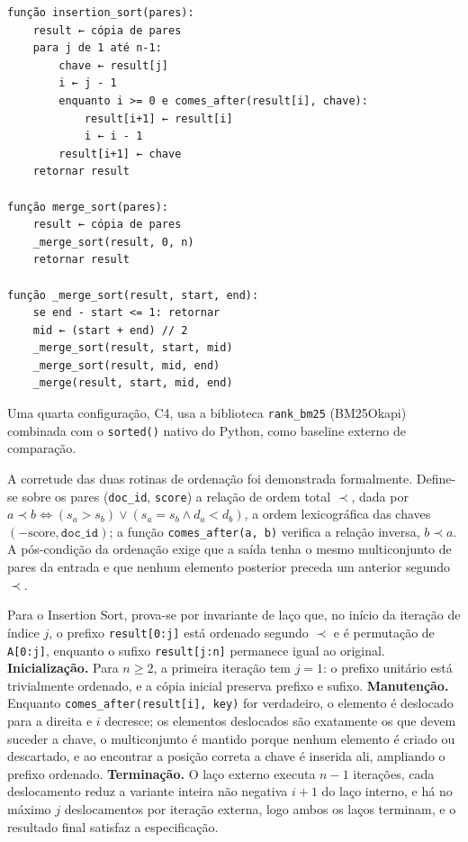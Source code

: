 \documentclass[12pt, a4paper]{article}
\begin{document}
\begin{verbatim}
função insertion_sort(pares):
    result ← cópia de pares
    para j de 1 até n-1:
        chave ← result[j]
        i ← j - 1
        enquanto i >= 0 e comes_after(result[i], chave):
            result[i+1] ← result[i]
            i ← i - 1
        result[i+1] ← chave
    retornar result

função merge_sort(pares):
    result ← cópia de pares
    _merge_sort(result, 0, n)
    retornar result

função _merge_sort(result, start, end):
    se end - start <= 1: retornar
    mid ← (start + end) // 2
    _merge_sort(result, start, mid)
    _merge_sort(result, mid, end)
    _merge(result, start, mid, end)
\end{verbatim}

Uma quarta configuração, C4, usa a biblioteca \texttt{rank\_bm25} (BM25Okapi) combinada com o \texttt{sorted()} nativo do Python, como baseline externo de comparação.

A corretude das duas rotinas de ordenação foi demonstrada formalmente. Define-se sobre os pares (\texttt{doc\_id}, \texttt{score}) a relação de ordem total $\prec$, dada por $a \prec b \iff (s_a > s_b) \lor (s_a = s_b \land d_a < d_b)$, a ordem lexicográfica das chaves $(-\text{score}, \texttt{doc\_id})$; a função \texttt{comes\_after(a, b)} verifica a relação inversa, $b \prec a$. A pós-condição da ordenação exige que a saída tenha o mesmo multiconjunto de pares da entrada e que nenhum elemento posterior preceda um anterior segundo $\prec$.

Para o Insertion Sort, prova-se por invariante de laço que, no início da iteração de índice $j$, o prefixo \texttt{result[0:j]} está ordenado segundo $\prec$ e é permutação de \texttt{A[0:j]}, enquanto o sufixo \texttt{result[j:n]} permanece igual ao original. \textbf{Inicialização.} Para $n \ge 2$, a primeira iteração tem $j=1$: o prefixo unitário está trivialmente ordenado, e a cópia inicial preserva prefixo e sufixo. \textbf{Manutenção.} Enquanto \texttt{comes\_after(result[i], key)} for verdadeiro, o elemento é deslocado para a direita e $i$ decresce; os elementos deslocados são exatamente os que devem suceder a chave, o multiconjunto é mantido porque nenhum elemento é criado ou descartado, e ao encontrar a posição correta a chave é inserida ali, ampliando o prefixo ordenado. \textbf{Terminação.} O laço externo executa $n-1$ iterações, cada deslocamento reduz a variante inteira não negativa $i+1$ do laço interno, e há no máximo $j$ deslocamentos por iteração externa, logo ambos os laços terminam, e o resultado final satisfaz a especificação.
\end{document}
